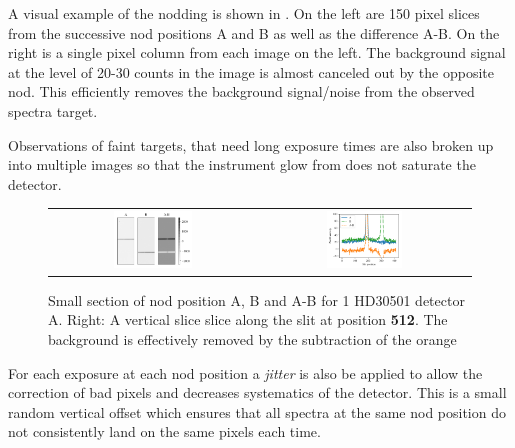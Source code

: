 A visual example of the nodding is shown in . On the left are 150 pixel slices from the successive nod positions A and B as well as the difference A-B. On the right is a single pixel column from each image on the left. The background signal at the level of 20-30 counts in the image is almost canceled out by the opposite nod. This efficiently removes the background signal/noise from the observed spectra target. 

Observations of faint targets, that need long exposure times are also broken up into multiple images so that the instrument glow from  does not saturate the detector.

\begin{figure}
    \centering
    \begin{tabular}{cc}
        \includegraphics[width=0.4\textwidth]{figures/reduction/nod_image_sample.pdf} &
        \includegraphics[width=0.37\textwidth]{figures/reduction/nod_slice_example.pdf}\\
    \end{tabular}
    \caption{Small section of nod position A, B and A-B for 1 HD30501 detector A. Right: A vertical slice slice along the slit at position \textbf{512}. The background is effectively removed by the subtraction of the orange}
    \label{fig:nodimages}
\end{figure}


For each exposure at each nod position a \emph{jitter} is also be applied to allow the correction of bad pixels and decreases systematics of the detector. This is a small random vertical offset which ensures that all spectra at the same nod position do not consistently land on the same pixels each time.

